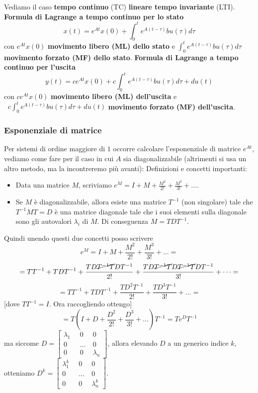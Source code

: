 \newline
Vediamo il caso \textbf{tempo continuo} (TC) \textbf{lineare tempo invariante} (LTI).\newline
\textbf{Formula di Lagrange a tempo continuo per lo stato}
\[
    x(t) = e^{At}x(0) + \int_{0}^{t}e^{A(t-\tau)}bu(\tau)d \tau
\]
con $e^{At}x(0)$ \textbf{movimento libero (ML) dello stato} e $\int_{0}^{t}e^{A(t-\tau)}bu(\tau)d \tau$ \textbf{movimento forzato (MF) dello stato}.\newline
\textbf{Formula di Lagrange a tempo continuo per l'uscita}
\[
    y(t) = c e^{At}x(0) + c\int_{0}^{t}e^{A(t-\tau)}bu(\tau)d \tau + du(t)
\]
con $ce^{At}x(0)$ \textbf{movimento libero (ML) dell'uscita} e $\;\; c\int_{0}^{t}e^{A(t-\tau)}bu(\tau)d \tau + du(t)$ \textbf{movimento forzato (MF) dell'uscita}.
\subsubsection{Esponenziale di matrice}
Per sistemi di ordine maggiore di $1$ occorre calcolare l'esponenziale di matrice $e^{At}$, vediamo come fare per il caso in cui $A$ sia diagonalizzabile (altrimenti si usa un altro metodo, ma la incontreremo più avanti):\newline
Definizioni e concetti importanti:
\begin{itemize}
    \item Data una matrice $M$, scriviamo $e^M = I + M + \frac{M^2}{2!} + \frac{M^3}{3!}+\dots$.
    \item Se $M$ è diagonalizzabile, allora esiste una matrice $T^{-1}$ (non singolare) tale che $T^{-1} M T = D$ è una matrice diagonale tale che i suoi elementi sulla diagonale sono gli autovalori $\lambda_i$ di $M$. Di conseguenza $M = T D T^{-1}$.
\end{itemize}
Quindi unendo questi due concetti posso scrivere
\[
    e^M = I + M + \frac{M^2}{2!} + \frac{M^3}{3!}+\dots=
\]
\[
    = TT^{-1} + T D T^{-1} + \frac{TD\cancel{T^{-1} T}DT^{-1}}{2!} + \frac{TD \cancel{T^{-1} T}D \cancel{T^{-1} T}DT^{-1}}{3!} + \dots =
\]
\[
    = TT^{-1} + T D T^{-1} + \frac{TD^2T^{-1}}{2!} + \frac{TD^3T^{-1}}{3!} + \dots=
\]
[dove $TT^{-1} = I$. Ora raccogliendo ottengo]
\[
    = T(I + D + \frac{D^2}{2!} + \frac{D^3}{3!} + \dots)T^{-1} = T e^{D}T^{-1}
\]
ma siccome $D = \left[\begin{matrix}
    \lambda_1 \;\; &0 \;\; &0\\
    0 & \dots &0\\
    0 &0 & \lambda_n
\end{matrix}\right]$, allora elevando $D$ a un generico indice $k$, otteniamo $D^k= \left[\begin{matrix}
    \lambda_1^k \;\; &0 \;\; &0\\
    0 & \dots &0\\
    0 &0 & \lambda_n^k
\end{matrix}\right]$.\newline
